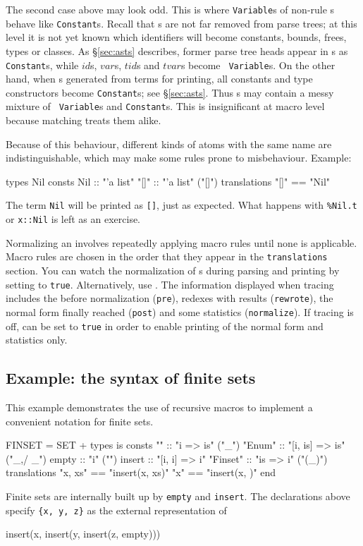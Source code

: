 The second case above may look odd.  This is where {\tt Variable}s of
non-rule \AST{}s behave like {\tt Constant}s.  Recall that \AST{}s are not
far removed from parse trees; at this level it is not yet known which
identifiers will become constants, bounds, frees, types or classes.  As
\S\ref{sec:asts} describes, former parse tree heads appear in \AST{}s as
{\tt Constant}s, while $id$s, $var$s, $tid$s and $tvar$s become {\tt
  Variable}s.  On the other hand, when \AST{}s generated from terms for
printing, all constants and type constructors become {\tt Constant}s; see
\S\ref{sec:asts}.  Thus \AST{}s may contain a messy mixture of {\tt
  Variable}s and {\tt Constant}s.  This is insignificant at macro level
because matching treats them alike.

Because of this behaviour, different kinds of atoms with the same name are
indistinguishable, which may make some rules prone to misbehaviour.  Example:
\begin{ttbox}
types
  Nil
consts
  Nil     :: "'a list"
  "[]"    :: "'a list"    ("[]")
translations
  "[]"    == "Nil"
\end{ttbox}
The term {\tt Nil} will be printed as {\tt []}, just as expected.  What
happens with \verb|%Nil.t| or {\tt x::Nil} is left as an exercise.

Normalizing an \AST{} involves repeatedly applying macro rules until none
is applicable.  Macro rules are chosen in the order that they appear in the
{\tt translations} section.  You can watch the normalization of \AST{}s
during parsing and printing by setting  to
{\tt true}. Alternatively, use
.  The information displayed when tracing
includes the \AST{} before normalization ({\tt pre}), redexes with results
({\tt rewrote}), the normal form finally reached ({\tt post}) and some
statistics ({\tt normalize}).  If tracing is off,
 can be set to {\tt true} in order to enable
printing of the normal form and statistics only.


\subsection{Example: the syntax of finite sets}
This example demonstrates the use of recursive macros to implement a
convenient notation for finite sets.
\begin{ttbox}
FINSET = SET +
types
  is
consts
  ""            :: "i => is"                ("_")
  "{\at}Enum"       :: "[i, is] => is"          ("_,/ _")
  empty         :: "i"                      ("{\ttlbrace}{\ttrbrace}")
  insert        :: "[i, i] => i"
  "{\at}Finset"     :: "is => i"                ("{\ttlbrace}(_){\ttrbrace}")
translations
  "{\ttlbrace}x, xs{\ttrbrace}"     == "insert(x, {\ttlbrace}xs{\ttrbrace})"
  "{\ttlbrace}x{\ttrbrace}"         == "insert(x, {\ttlbrace}{\ttrbrace})"
end
\end{ttbox}
Finite sets are internally built up by {\tt empty} and {\tt insert}.  The
declarations above specify \verb|{x, y, z}| as the external representation
of
\begin{ttbox}
insert(x, insert(y, insert(z, empty)))
\end{ttbox}

